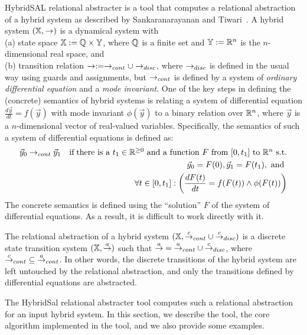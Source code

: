 \documentclass{llncs}
\begin{document}
HybridSAL relational abstracter is a tool that computes a relational
abstraction of a hybrid system as described by
Sankaranarayanan and Tiwari~\cite{ST11:CAVsmall}.
A hybrid system $(\mathbb{X}, \rightarrow)$ is a dynamical system with 
\\
(a) state space $\mathbb{X} := \mathbb{Q}\times\mathbb{Y}$, where $\mathbb{Q}$ is a finite set and
$\mathbb{Y} := \mathbb{R}^n$ is the $n$-dimensional real space,
and 
\\
(b)
transition relation $\rightarrow := \rightarrow_{cont}\cup\rightarrow_{disc}$, where
$\rightarrow_{disc}$ is defined in the usual way using guards and
assignments, but $\rightarrow_{cont}$ is defined by a system of
{\em{ordinary differential equation}} and a {\em{mode invariant}}.
One of the key steps in defining the (concrete)
semantics of hybrid systems
is relating a system of differential equation
$\frac{d\vec{y}}{dt} = f(\vec{y})$ with mode invariant
$\phi(\vec{y})$ to a binary relation 
over $\mathbb{R}^n$, where $\vec{y}$ is a $n$-dimensional vector of
real-valued variables.  Specifically, the semantics of
such a system of differential equations is defined as:
\begin{eqnarray}
\vec{y}_0 \ra_{cont} \vec{y}_1 & &
\mbox{if}\;
\mbox{there is a $t_1\in\RR^{\geq 0}$ and 
a function $F$ from $[0,t_1]$ to $\RR^n$ s.t.} \nonumber %
\\ & &
\vec{y}_0 = F(0),
\vec{y}_1 = F(t_1), \mbox{ and } \nonumber
\\ & &
\forall{t\in [0,t_1]}:
\left(\frac{dF(t)}{dt} = f(F(t)) \wedge \phi(F(t))\right)\label{eqn:sem}
%
\end{eqnarray}
The concrete semantics is defined using the ``solution''
$F$ of the system of differential equations.  As a result,
it is difficult to work directly with it.

The relational abstraction of a hybrid system 
$(\mathbb{X}, {\stackrel{c}{\rightarrow}}_{cont}\cup{\stackrel{c}{\rightarrow}}_{disc})$ 
is a discrete state transition system $(\mathbb{X}, {\stackrel{a}{\rightarrow}})$ such that
${\stackrel{a}{\rightarrow}} = {\stackrel{a}{\rightarrow}}_{cont}\cup{\stackrel{c}{\rightarrow}}_{disc}$, where 
${\stackrel{c}{\rightarrow}}_{cont} \subseteq {\stackrel{a}{\rightarrow}}_{cont}$.
In other words, the discrete transitions of the hybrid system
are left untouched by the relational abstraction, and only the
transitions defined by differential equations are abstracted.

The HybridSal relational abstracter tool computes such a relational
abstraction for an input hybrid system. 
In this section, we describe the tool, the core algorithm implemented in the
tool, and we also provide some examples. %
\end{document}
